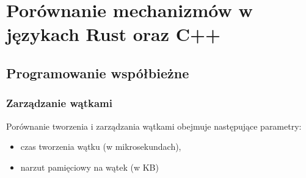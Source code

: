 





\chapter{Porównanie mechanizmów w językach Rust oraz C++}
\section{Programowanie współbieżne}
\subsection{Zarządzanie wątkami}
Porównanie tworzenia i zarządzania wątkami obejmuje następujące parametry:
\begin{itemize}
\item czas tworzenia wątku (w mikrosekundach),
\item narzut pamięciowy na wątek (w KB)
\end{itemize}


